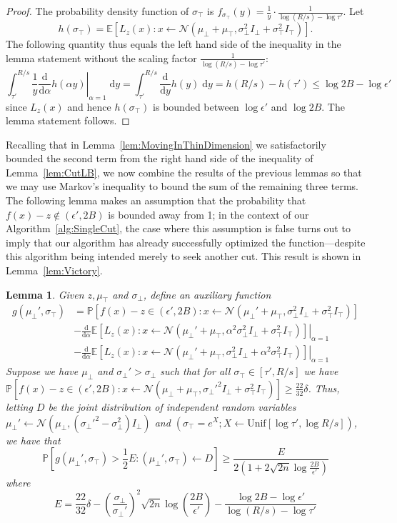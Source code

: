 \documentclass[11pt,letter]{article}
\renewcommand{\Pr}{\mathbb{P}}
\newcommand{\Exp}{\mathbb{E}}
\newcommand{\from}{\leftarrow}
\newcommand{\Normal}{\mathcal{N}}
\newcommand{\Unif}{\mathrm{Unif}}
\renewcommand{\d}{\mathrm{d}}
\newcommand{\Diff}[2][]{\frac{\d#1}{\d#2}}
\newcommand{\ferr}{\epsilon}
\newcommand{\perr}{\delta}
\newcommand{\safety}{s}
\newcounter{nTheorems}
\numberwithin{nTheorems}{section}
\newtheorem{lemma}[nTheorems]{Lemma}
\begin{document}
\begin{proof}
The probability density function of $\sigma_\top$ is $f_{\sigma_\top}(y) = \frac{1}{y}\cdot\frac{1}{\log (R/\safety) - \log \tau'}$.
Let $$ h(\sigma_\top) = \Exp\left[L_z(x) : x \from \Normal(\mu_\bot + \mu_\top, \sigma_\bot^2 I_\bot + \sigma_\top^2 I_\top) \right]. $$
The following quantity thus equals the left hand side of the inequality in the lemma statement without the scaling factor $\frac{1}{\log (R/\safety) - \log \tau'}$:
$$ \int_{\tau'}^{R/\safety} \frac{1}{y} \left.\Diff{\alpha} h(\alpha y)\right|_{\alpha = 1} \; \d y = \int_{\tau'}^{R/\safety} \Diff{y} h(y) \; \d y = h(R/\safety) - h(\tau') \le \log 2B - \log \epsilon' $$
since $L_z(x)$ and hence $h(\sigma_\top)$ is bounded between $\log \epsilon'$ and $\log 2B$.
The lemma statement follows.
\end{proof}


Recalling that in Lemma~\ref{lem:MovingInThinDimension} we satisfactorily bounded the second term from the right hand side of the inequality of Lemma~\ref{lem:CutLB}, we now combine the results of the previous lemmas so that we may use Markov's inequality to bound the sum of the remaining three terms. The following lemma makes an assumption that the probability that $f(x)-z \notin (\ferr',2B)$ is bounded away from 1; in the context of our Algorithm~\ref{alg:SingleCut}, the case where this assumption is false turns out to imply that our algorithm has already successfully optimized the function---despite this algorithm being intended merely to seek another cut. This result is shown in Lemma~\ref{lem:Victory}.

\begin{lemma}
\label{lem:MarkovGadget}
Given $z, \mu_\top$ and $\sigma_\bot$, define an auxiliary function
\begin{align*}
g(\mu_\bot', \sigma_\top) &= \Pr[f(x)-z \in (\epsilon',2B) : x \from \Normal(\mu_\bot' + \mu_\top, \sigma_\bot^2 I_\bot + \sigma_\top^2 I_\top)]\\
&-\left.\Diff{\alpha} \Exp\left[L_z(x) : x \from \Normal(\mu_\bot' + \mu_\top, \alpha^2\sigma_\bot^2 I_\bot + \sigma_\top^2 I_\top) \right]\right|_{\alpha = 1}\\
&- \left.\Diff{\alpha} \Exp\left[L_z(x) : x \from \Normal(\mu_\bot' + \mu_\top, \sigma_\bot^2 I_\bot + \alpha^2\sigma_\top^2 I_\top) \right]\right|_{\alpha = 1}
\end{align*}
Suppose we have $\mu_\bot$ and $\sigma_\bot' > \sigma_\bot$ such that for all $\sigma_\top\in [\tau',R/\safety]$ we have $\Pr[f(x)-z \in (\epsilon',2B) : x \from \Normal(\mu_\bot + \mu_\top, \sigma_\bot'^2 I_\bot + \sigma_\top^2 I_\top)] \ge \frac{22}{32}\perr$.
Thus, letting $D$ be the joint distribution of independent random variables $\mu_\bot'\from\Normal(\mu_\bot, (\sigma_\bot'^2 - \sigma_\bot^2)I_\bot)$ and $(\sigma_\top = e^X; X \from \Unif[\log \tau', \log R/\safety])$, we have that
$$ \Pr[g(\mu_\bot', \sigma_\top) > \frac{1}{2}E : (\mu_\bot', \sigma_\top) \from D] \ge \frac{E}{2(1+2\sqrt{2n}\log\frac{2B}{\epsilon'})} $$
where
$$ E = \frac{22}{32}\perr - \left(\frac{\sigma_\bot}{\sigma_\bot'}\right)^2\sqrt{2n}\log\left(\frac{2B}{\epsilon'}\right) - \frac{\log 2B - \log \epsilon'}{\log (R/\safety) - \log \tau'}$$
\end{lemma}
\end{document}
